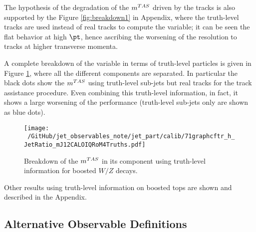 The hypothesis of the degradation of the $\mtas$ driven by the tracks is also supported by the Figure \ref{fig:breakdown1} in Appendix, where the truth-level tracks are used instead of real tracks to compute the variable; it can be seen the flat behavior at high $\pt$, hence ascribing the worsening of the resolution to tracks at higher transverse momenta.


A complete breakdown of the variable in terms of truth-level particles is given in Figure \ref{fig:breakdown2}, where all the different components are separated.
In particular the black dots show the $\mtas$ using truth-level sub-jets but real tracks for the track assistance procedure.
Even combining this truth-level information, in fact, it shows a large worsening of the performance (truth-level sub-jets only are shown as blue dots).


\begin{figure}[!ht]
  \centering
      \texttt{[image: ~/GitHub/jet\_observables\_note/jet\_part/calib/71graphcftr\_h\_JetRatio\_mJ12CALOIQRoM4Truths.pdf]}
  \caption[Breakdown of the $\mtas$ ]{Breakdown of the $\mtas$ in its component using truth-level information for boosted $W/Z$ decays.}
  \label{fig:breakdown2}
\end{figure}

Other results using truth-level information on boosted tops are shown and described in the Appendix.


% 


\subsection{Alternative Observable Definitions}
\label{sec:alternate}

